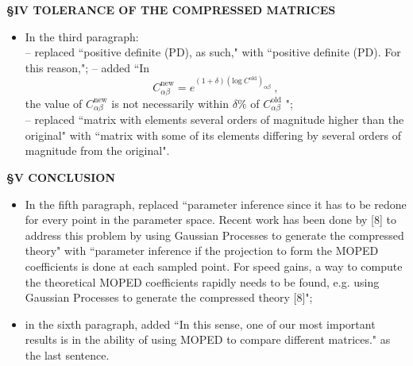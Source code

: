 \documentclass[11pt]{article}
\begin{document}
\noindent \textbf{\S IV \quad \small{TOLERANCE OF THE COMPRESSED MATRICES}}
\begin{itemize}
	\item In the third paragraph:\\
		-- replaced ``positive definite (PD), as such," with ``positive definite (PD). For this reason,";
		-- added ``In 
			\begin{equation}
				C_{\alpha \beta}^{\text{new}} = e^{(1 + \delta)(\text{log}\ C^{\text{old}})_{\alpha \beta}}\ ,\tag{15}
			\end{equation}
			the value of $C_{\alpha \beta}^{\text{new}}$ is not necessarily within $\delta \%$ of $C_{\alpha \beta}^{\text{old}}$ ";\\
		-- replaced ``matrix with elements several orders of magnitude higher than the original" with ``matrix with some of its elements differing by several orders of magnitude from the original".
\end{itemize}

\noindent \textbf{\S V \quad \small{CONCLUSION}}
\begin{itemize}
	\item In the fifth paragraph, replaced ``parameter inference since it has to be redone for every point in the parameter space. Recent work has been done by [8] to address this problem by using Gaussian Processes to generate the compressed theory" with ``parameter inference if the projection to form the MOPED coefficients is done at each sampled point.  For speed gains, a way to compute the theoretical MOPED coefficients rapidly needs to be found, e.g. using Gaussian Processes to generate the compressed theory [8]";
	\item in the sixth paragraph, added ``In this sense, one of our most important results is in the ability of using MOPED to compare different matrices." as the last sentence.
\end{itemize}
	
\end{document}
